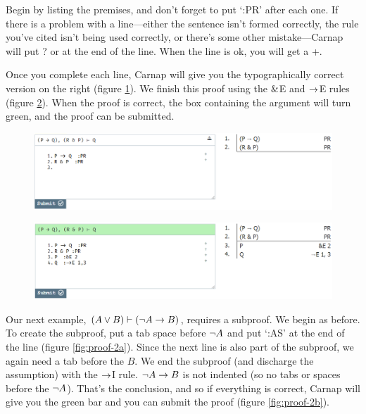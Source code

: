 Begin by listing the premises, and don't forget to put `:PR' after each one. If there is a problem with a line---either the sentence isn't formed correctly, the rule you've cited isn't being used correctly, or there's some other mistake---Carnap will put \textsf{?} or {\selectfont{}\relax}  at the end of the line. When the line is ok, you will get a +.

Once you complete each line, Carnap will give you the typographically correct version on the right (figure \ref{fig:proof-1b}). We finish this proof using the $\mathbin{\&}$E and $\rightarrow$E rules (figure \ref{fig:proof-1c}). When the proof is correct, the box containing the argument will turn green, and the proof can be submitted. 

\begin{figure}[h]
\includegraphics[width=13cm]{textbook--1b.PNG}
\caption{}
\label{fig:proof-1b}
\end{figure}

\begin{figure}[h]
\includegraphics[width=13cm]{textbook--1c.PNG}
\caption{}
\label{fig:proof-1c}
\end{figure}

Our next example, $(A \vee B) \vdash ({\neg} A \rightarrow B)$, requires a subproof. We begin as before. To create the subproof, put a tab space before ${\neg} A$ and put `:AS' at the end of the line (figure \ref{fig:proof-2a}). Since the next line is also part of the subproof, we again need a tab before the $B$. We end the subproof (and discharge the assumption) with the $\rightarrow$I rule. ${\neg} A \rightarrow B$ is not indented (so no tabs or spaces before the ${\neg} A$). That's the conclusion, and so if everything is correct, Carnap will give you the green bar and you can submit the proof (figure \ref{fig:proof-2b}). 

